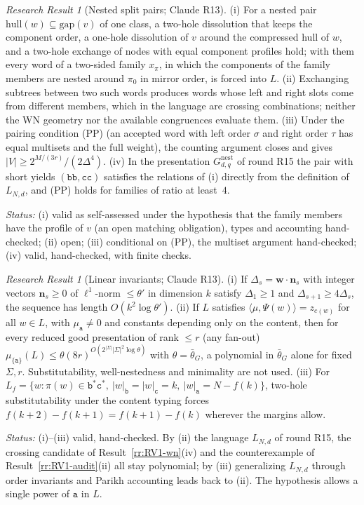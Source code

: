 \documentclass[11pt]{article}
\numberwithin{equation}{section}
\theoremstyle{plain}
\theoremstyle{definition}
\theoremstyle{remark}
\newtheorem{rresult}[theorem]{Research Result}
\theoremstyle{plain}
\begin{document}
\begin{rresult}[Nested split pairs; Claude R13]
\label{rr:R13-nested}
(i) For a nested pair $\mathrm{hull}(w)\subseteq\mathrm{gap}(v)$ of one class, a two-hole dissolution that
keeps the component order, a one-hole dissolution of $v$ around the compressed hull of $w$, and a two-hole
exchange of nodes with equal component profiles hold; with them every word of a two-sided family
$x_\pi$, in which the components of the family members are nested around $\pi_0$ in mirror order, is forced
into $L$.
(ii) Exchanging subtrees between two such words produces words whose left and right slots come from
different members, which in the language are crossing combinations; neither the WN geometry nor
the available congruences evaluate them.
(iii) Under the pairing condition (PP) (an accepted word with left order $\sigma$ and right order $\tau$ has
equal multisets and the full weight), the counting argument closes and gives
$|V|\ge2^{M/(3r)}/(2\Delta^4)$.
(iv) In the presentation $G^{\mathrm{nest}}_{d,q}$ of round R15 the pair with short yields
$(\mathtt{bb},\mathtt{cc})$ satisfies the relations of (i) directly from the definition of $L_{N,d}$, and
(PP) holds for families of ratio at least~$4$.
\end{rresult}
\noindent\emph{Status:} (i) valid as self-assessed under the hypothesis that the family members have the
profile of $v$ (an open matching obligation), types and accounting hand-checked; (ii) open; (iii)
conditional on (PP), the multiset argument hand-checked; (iv) valid, hand-checked, with finite checks.

\begin{rresult}[Linear invariants; Claude R13]
\label{rr:R13-linear}
(i) If $\Delta_s=\mathbf w\cdot\mathbf n_s$ with integer vectors $\mathbf n_s\ge0$ of $\ell^1$-norm
$\le\theta'$ in dimension $k$ satisfy $\Delta_1\ge1$ and $\Delta_{s+1}\ge4\Delta_s$, the sequence has length
$O(k^2\log\theta')$.
(ii) If $L$ satisfies $\langle\mu,\Psi(w)\rangle=z_{c(w)}$ for all $w\in L$, with $\mu_{\mathtt a}\ne0$ and
constants depending only on the content, then for every reduced good presentation of rank $\le r$ (any
fan-out) $\mu_{\{\mathtt a\}}(L)\le\theta(8r)^{O(2^{|\Sigma|}|\Sigma|^2\log\theta)}$ with
$\theta=\bar\theta_G$, a polynomial in $\bar\theta_G$ alone for fixed $\Sigma,r$.  Substitutability,
well-nestedness and minimality are not used.
(iii) For $L_f=\{w:\pi(w)\in\mathtt b^*\mathtt c^*,\ |w|_{\mathtt b}=|w|_{\mathtt c}=k,\ |w|_{\mathtt a}=N-f(k)\}$,
two-hole substitutability under the content typing forces $f(k+2)-f(k+1)=f(k+1)-f(k)$ wherever the margins
allow.
\end{rresult}
\noindent\emph{Status:} (i)--(iii) valid, hand-checked.  By (ii) the language $L_{N,d}$ of round R15, the
crossing candidate of Result~\ref{rr:RV1-wn}(iv) and the counterexample of Result~\ref{rr:RV1-audit}(ii)
all stay polynomial; by (iii) generalizing $L_{N,d}$ through order invariants and Parikh accounting leads
back to (ii).  The hypothesis allows a single power of $\mathtt a$ in $L$.
\end{document}
